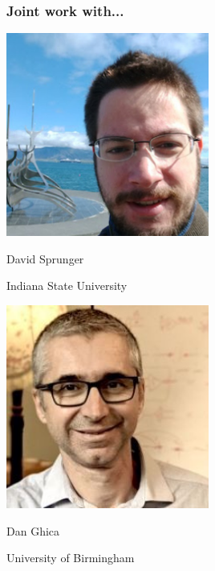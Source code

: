 \begin{frame}
    \frametitle{Joint work with...}

    \begin{minipage}{0.49\textwidth}
        \centering
        \includegraphics[width=0.5\textwidth]{imgs/sprunger}

        David Sprunger

        \scriptsize
        Indiana State University
    \end{minipage}
    \wait
    \begin{minipage}{0.49\textwidth}
        \centering
        \includegraphics[width=0.5\textwidth]{imgs/ghica}

        Dan Ghica

        \scriptsize
        University of Birmingham
    \end{minipage}
\end{frame}
